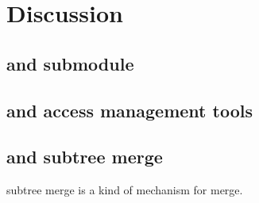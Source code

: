 \section{Discussion}
\label{s:discussion}
\label{s:disc}

\subsection{\Sys and \git submodule}

\subsection{\Sys and \git access management tools}
\iffalse
\fi

\subsection{\Sys and \git subtree merge}

\Git subtree merge is a kind of mechanism for \git merge. 
\cite{git-subtree-merge}

\iffalse
It seems to be a mechanism for "git merge". The mechanism is to combine two
commit trees from different branches together to form a new commit tree.

It has some similarity with "partial commit" in FVM, because what partial commit
does is to merge the changes of the user's work dir (or a subtree) with the
original commit tree. However there are differences. git subtree merge can only
be applied to different branches, and as the document says, are used to merge
two different projects together. Instead, FVM partial commit is used to combine
the subset of changes with the (unchanged files) in old commit. Another
difference is that in subtree merge, one of the tree becomes the subtree of
another, but in FVM partial commit, a subset files (which does NOT need to be a
tree!) replaces the same position in the old commit.

So basically these are two different mechanisms. subtree merge cannot be used to
solve our problems. We may include some discussions in the paper, if needed.
\fi

